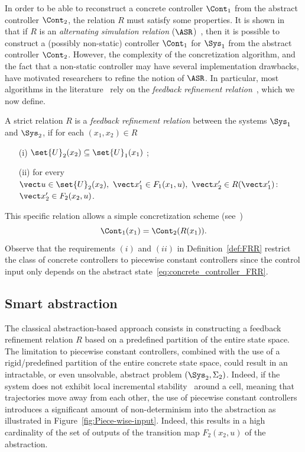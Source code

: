 \documentclass{juliacon}
\begin{document}
In order to be able to reconstruct a concrete controller $\Cont_1$ from the abstract controller $\Cont_2$, the relation $R$ must satisfy some properties. It is shown in~\cite[Theorem 1]{Calbert2024a} that if $R$ is an \emph{alternating simulation relation} ($\ASR$)~\cite[Definition 4.19]{tabuada2009verification}, then it is possible to construct a (possibly non-static) controller $\Cont_1$ for $\Sys_1$ from the abstract controller $\Cont_2$.
%
However, the complexity of the concretization algorithm, and the fact that a non-static controller may have several implementation drawbacks, have motivated researchers to refine the notion of $\ASR$. In particular, most algorithms in the literature~\cite{rungger2016scots,borri2018design,calbert2021alternating} rely on the \emph{feedback refinement relation}~\cite[Def. V.2]{reissig2016feedback}, which we now define.
\begin{defi}\label{def:FRR}
A strict relation $R$ is a \emph{feedback refinement relation} between the systems $\Sys_1$ and $\Sys_2$, if for each $(x_1,x_2)\in R$
\begin{enumerate}
    \item[(i)] $\set{U}_2(x_2)\subseteq \set{U}_1(x_1)$ \label{cond:i:FRR};
    \item[(ii)] for every $\vect u \in \set{U}_2(x_2),\ \vect x_1'\in F_1(x_1, u), \ \vect x_2'\in R(\vect x_1')$: $ \vect x_2'\in F_2(x_2, u)$.
\end{enumerate}
\end{defi}

This specific relation allows a simple concretization scheme (see~\cite[V.4 Theorem]{reissig2016feedback})
\begin{equation}\label{eq:concrete_controller_FRR}
    \Cont_1(x_1) = \Cont_2(R(x_1)).
\end{equation}
Observe that the requirements $(i)$ and $(ii)$ in Definition~\ref{def:FRR} restrict the class of concrete controllers to piecewise constant controllers since the control input only depends on the abstract state~\eqref{eq:concrete_controller_FRR}. 

\subsection{Smart abstraction} 

The classical abstraction-based approach consists in constructing a feedback refinement relation $R$ based on a predefined partition of the entire state space. 
The limitation to piecewise constant controllers, combined with the use of a rigid/predefined partition of the entire concrete state space, could result in an intractable, or even unsolvable, abstract problem $(\Sys_2, \Sigma_2)$.
Indeed, if the system does not exhibit local incremental stability~\cite[Definition 2.1]{angeli2002lyapunov}\cite{lohmiller1998contraction} around a cell, meaning that trajectories move away from each other, the use of piecewise constant controllers introduces a significant amount of non-determinism into the abstraction as illustrated in Figure~\ref{fig:Piece-wise-input}. 
%
Indeed, this results in a high cardinality of the set of 
outputs of the transition map $F_2(x_2,u)$ of the abstraction.
\vskip 6pt
\end{document}
